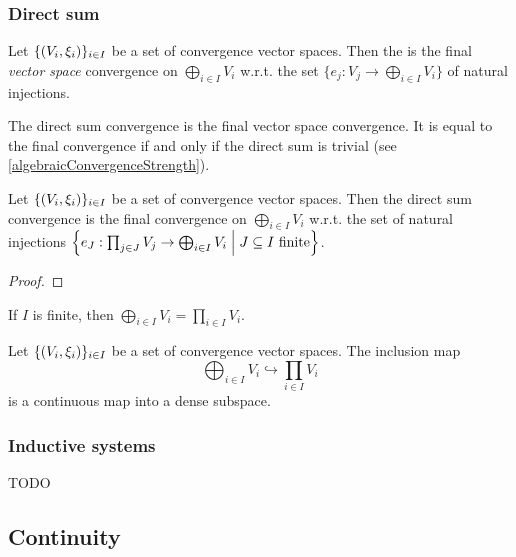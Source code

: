 \subsubsection{Direct sum}
\begin{definition}
Let $\{\left( V_i, \xi_i \right)\}_{i\in I}$ be a set of convergence vector spaces. Then the  is the final \emph{vector space} convergence on $\bigoplus_{i\in I}V_i$ w.r.t. the set $\{e_j: V_j \to \bigoplus_{i\in I}V_i\}$ of natural injections.
\end{definition}
The direct sum convergence is the final vector space convergence. It is equal to the final convergence if and only if the direct sum is trivial (see \ref{algebraicConvergenceStrength}).

\begin{proposition}
Let $\{\left( V_i, \xi_i \right)\}_{i\in I}$ be a set of convergence vector spaces. Then the direct sum convergence is the final convergence on $\bigoplus_{i\in I}V_i$ w.r.t. the set of natural injections $\left\{ e_J: \prod_{j\in J} V_j \to \bigoplus_{i\in I}V_i \;\middle|\; \text{$J\subseteq I$ finite} \right\}$.
\end{proposition}
\begin{proof}

\end{proof}
\begin{corollary}
If $I$ is finite, then $\bigoplus_{i\in I}V_i = \prod_{i\in I}V_i$.
\end{corollary}

\begin{proposition}
Let $\{\left( V_i, \xi_i \right)\}_{i\in I}$ be a set of convergence vector spaces. The inclusion map
\[ \bigoplus_{i\in I}V_i \hookrightarrow \prod_{i\in I}V_i \]
is a continuous map into a dense subspace.
\end{proposition}

\subsubsection{Inductive systems}
TODO


\subsection{Continuity}

